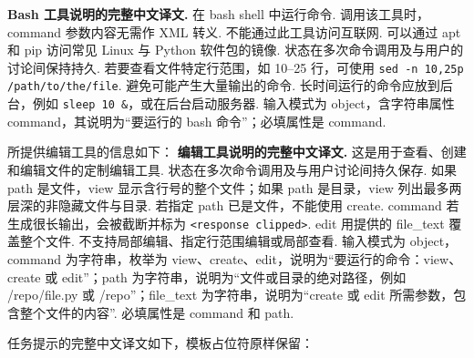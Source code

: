 \textbf{Bash 工具说明的完整中文译文.}
在 bash shell 中运行命令. 调用该工具时，command 参数内容无需作 XML 转义. 不能通过此工具访问互联网. 可以通过 apt 和 pip 访问常见 Linux 与 Python 软件包的镜像. 状态在多次命令调用及与用户的讨论间保持持久. 若要查看文件特定行范围，如 10--25 行，可使用 \texttt{sed -n 10,25p /path/to/the/file}. 避免可能产生大量输出的命令. 长时间运行的命令应放到后台，例如 \texttt{sleep 10 \&}，或在后台启动服务器. 输入模式为 object，含字符串属性 command，其说明为“要运行的 bash 命令”；必填属性是 command.

所提供编辑工具的信息如下：
\textbf{编辑工具说明的完整中文译文.}
这是用于查看、创建和编辑文件的定制编辑工具. 状态在多次命令调用及与用户讨论间持久保存. 如果 path 是文件，view 显示含行号的整个文件；如果 path 是目录，view 列出最多两层深的非隐藏文件与目录. 若指定 path 已是文件，不能使用 create. command 若生成很长输出，会被截断并标为 \texttt{<response clipped>}. edit 用提供的 file\_text 覆盖整个文件. 不支持局部编辑、指定行范围编辑或局部查看. 输入模式为 object，command 为字符串，枚举为 view、create、edit，说明为“要运行的命令：view、create 或 edit”；path 为字符串，说明为“文件或目录的绝对路径，例如 /repo/file.py 或 /repo”；file\_text 为字符串，说明为“create 或 edit 所需参数，包含整个文件的内容”. 必填属性是 command 和 path.

任务提示的完整中文译文如下，模板占位符原样保留：
